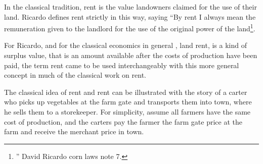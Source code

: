 

In the classical tradition, rent is the value landowners claimed for the use of their land. Ricardo defines rent strictly in this way, saying ``By rent I always mean the remuneration given to the landlord for the use of the original power of the land\footnote{'' David Ricardo corn laws note 7.}. %

For Ricardo, and for the classical economics in general , land rent, is a kind of surplus value, that is an amount available after the costs of production have been paid, the term rent came to be used interchangeably with this more general concept in much of the classical work on rent.

The classical idea of rent and rent can be illustrated with the story of a carter who picks up vegetables at the farm gate and transports them into town, where he sells them to a  storekeeper. %
For simplicity, assume all farmers have the same cost of production, and the carters pay the farmer the farm gate price at the farm and receive the merchant price in town. 

